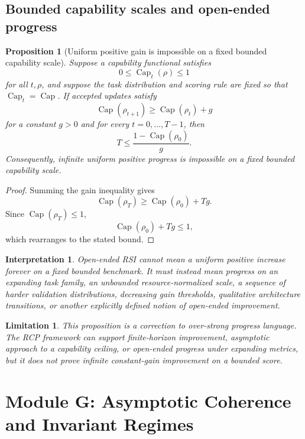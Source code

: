 \documentclass[11pt]{article}
\newtheorem{proposition}[theorem]{Proposition}
\newtheorem{interpretation}[theorem]{Interpretation}
\newtheorem{limitation}[theorem]{Limitation}
\newcommand{\1}{\mathbf{1}}
\renewcommand{\Cap}{\operatorname{Cap}}
\begin{document}
\subsection{Bounded capability scales and open-ended progress}

\begin{proposition}[Uniform positive gain is impossible on a fixed bounded capability scale]
\label{prop:bounded_capability_uniform_gain_impossible}
Suppose a capability functional satisfies
\[
0\le\Cap_t(\rho)\le1
\]
for all \(t,\rho\), and suppose the task distribution and scoring rule are fixed so that \(\Cap_t=\Cap\).  If accepted updates satisfy
\[
\Cap(\rho_{t+1})\ge\Cap(\rho_t)+g
\]
for a constant \(g>0\) and for every \(t=0,\dots,T-1\), then
\[
T\le\frac{1-\Cap(\rho_0)}{g}.
\]
Consequently, infinite uniform positive progress is impossible on a fixed bounded capability scale.
\end{proposition}

\begin{proof}
Summing the gain inequality gives
\[
\Cap(\rho_T)
\ge
\Cap(\rho_0)+Tg.
\]
Since \(\Cap(\rho_T)\le1\),
\[
\Cap(\rho_0)+Tg\le1,
\]
which rearranges to the stated bound.
\end{proof}

\begin{interpretation}
Open-ended RSI cannot mean a uniform positive increase forever on a fixed bounded benchmark.  It must instead mean progress on an expanding task family, an unbounded resource-normalized scale, a sequence of harder validation distributions, decreasing gain thresholds, qualitative architecture transitions, or another explicitly defined notion of open-ended improvement.
\end{interpretation}

\begin{limitation}
This proposition is a correction to over-strong progress language.  The RCP framework can support finite-horizon improvement, asymptotic approach to a capability ceiling, or open-ended progress under expanding metrics, but it does not prove infinite constant-gain improvement on a bounded score.
\end{limitation}

\section{Module G: Asymptotic Coherence and Invariant Regimes}
\label{sec:asymptotic_coherence_invariant_regimes}
\end{document}
